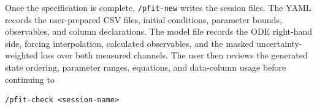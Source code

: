 Once the specification is complete, \texttt{/pfit-new} writes the session files.
The YAML records the user-prepared CSV files, initial conditions, parameter
bounds, observables, and column declarations. The model file records the ODE
right-hand side, forcing interpolation, calculated observables, and the masked
uncertainty-weighted loss over both measured channels. The user then reviews the generated state ordering,
parameter ranges, equations, and data-column usage before continuing to

\begin{verbatim}
/pfit-check <session-name>
\end{verbatim}
